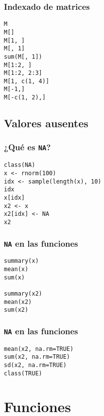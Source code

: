 \documentclass[xcolor={usenames,svgnames,dvipsnames}]{beamer}
\begin{document}
\begin{frame}[fragile]
\frametitle{Indexado de matrices}
\label{sec-2-2-7}


\lstset{language=R}
\begin{lstlisting}
M
M[]
M[1, ]
M[, 1]
sum(M[, 1])
M[1:2, ]
M[1:2, 2:3]
M[1, c(1, 4)]
M[-1,]
M[-c(1, 2),]
\end{lstlisting}
    
\end{frame}
\subsection{Valores ausentes}
\label{sec-2-3}

   
\begin{frame}[fragile]
\frametitle{¿Qué es \texttt{NA}?}
\label{sec-2-3-1}


\lstset{language=R}
\begin{lstlisting}
class(NA)
x <- rnorm(100)
idx <- sample(length(x), 10)
idx
x[idx]
x2 <- x
x2[idx] <- NA
x2
\end{lstlisting}
\end{frame}
\begin{frame}[fragile]
\frametitle{\texttt{NA} en las funciones}
\label{sec-2-3-2}



\lstset{language=R}
\begin{lstlisting}
summary(x)
mean(x)
sum(x)

summary(x2)
mean(x2)
sum(x2)
\end{lstlisting}
\end{frame}
\begin{frame}[fragile]
\frametitle{\texttt{NA} en las funciones}
\label{sec-2-3-3}



\lstset{language=R}
\begin{lstlisting}
mean(x2, na.rm=TRUE)
sum(x2, na.rm=TRUE)
sd(x2, na.rm=TRUE)
class(TRUE)
\end{lstlisting}
\end{frame}
\section{Funciones}
\label{sec-3}
\end{document}

